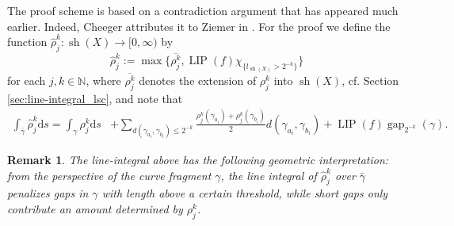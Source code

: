 \documentclass{amsart}
\newtheorem{remark}[theorem]{Remark}
\numberwithin{equation}{section}
\newcommand{\N}{\mathbb{N}}
\newcommand{\LIP}{\operatorname{LIP}}
\newcommand{\gap}{\operatorname{gap}}
\newcommand{\sh}{\operatorname{sh}}
\newcommand{\ud}{\mathrm {d}}
\begin{document}
The proof scheme is based on a contradiction argument that has appeared much earlier. Indeed,  Cheeger attributes it to Ziemer in \cite[Remark 5.22]{che99}. For the proof we define the function $\widehat\rho_j^k:\sh(X)\to [0,\infty)$ by
\[
\widehat\rho_j^k:=\max\{\overline{\rho_j^k},\LIP(f)\chi_{\{l_{\sh(X)}>2^{-k}\}}\}
\]
for each $j,k\in\N$, where $\overline{\rho_j^k}$ denotes the extension of $\rho_j^k$ into $\sh(X)$, cf. Section \ref{sec:line-integral_lsc}, and note that
\begin{align*}
\int_{\bar\gamma}\widehat\rho_j^{k}\ud s
= \int_{\gamma}\rho_j^k\ud s &+\sum_{d(\gamma_{a_i},\gamma_{b_i})\le 2^{-k}}\frac{\rho^k_j(\gamma_{a_i})+\rho^k_j(\gamma_{b_i})}{2}d(\gamma_{a_i},\gamma_{b_i})+\LIP(f)\gap_{2^{-k}}(\gamma).
\end{align*}

\begin{remark}
The line-integral above has the following geometric interpretation: from the perspective of the curve fragment $\gamma$, the line integral of $\widehat \rho_j^k$ over $\bar\gamma$ penalizes gaps in $\gamma$ with length above a certain threshold, while short gaps only contribute an amount determined by $\rho_j^k$.
\end{remark}
\end{document}

